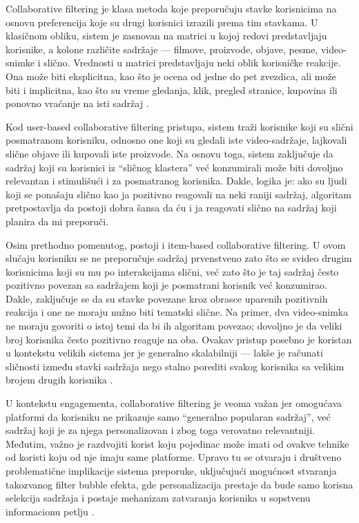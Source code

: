 Collaborative filtering je klasa metoda koje preporučuju stavke korisnicima na osnovu preferencija koje su drugi korisnici izrazili prema tim stavkama. U klasičnom obliku, sistem je zasnovan na matrici u kojoj redovi predstavljaju korisnike, a kolone različite sadržaje — filmove, proizvode, objave, pesme, video-snimke i slično. Vrednosti u matrici predstavljaju neki oblik korisničke reakcije. Ona može biti eksplicitna, kao što je ocena od jedne do pet zvezdica, ali može biti i implicitna, kao što su vreme gledanja, klik, pregled stranice, kupovina ili ponovno vraćanje na isti sadržaj \cite{wen2008collaborative}.

Kod user-based collaborative filtering pristupa, sistem traži korisnike koji su slični posmatranom korisniku, odnosno one koji su gledali iste video-sadržaje, lajkovali slične objave ili kupovali iste proizvode. Na osnovu toga, sistem zaključuje da sadržaj koji su korisnici iz “sličnog klastera” već konzumirali može biti dovoljno relevantan i stimulišući i za posmatranog korisnika. Dakle, logika je: ako su ljudi koji se ponašaju slično kao ja pozitivno reagovali na neki raniji sadržaj, algoritam pretpostavlja da postoji dobra šansa da ću i ja reagovati slično na sadržaj koji planira da mi preporuči.

Osim prethodno pomenutog, postoji i item-based collaborative filtering. U ovom slučaju korisniku se ne preporučuje sadržaj prvenstveno zato što se svideo drugim korisnicima koji su mu po interakcijama slični, već zato što je taj sadržaj često pozitivno povezan sa sadržajem koji je posmatrani korisnik već konzumirao. Dakle, zaključuje se da su stavke povezane kroz obrasce uparenih pozitivnih reakcija i one ne moraju nužno biti tematski slične. Na primer, dva video-snimka ne moraju govoriti o istoj temi da bi ih algoritam povezao; dovoljno je da veliki broj korisnika često pozitivno reaguje na oba. Ovakav pristup posebno je koristan u kontekstu velikih sistema jer je generalno skalabilniji — lakše je računati sličnosti između stavki sadržaja nego stalno porediti svakog korisnika sa velikim brojem drugih korisnika \cite{wen2008collaborative}.

U kontekstu engagementa, collaborative filtering je veoma važan jer omogućava platformi da korisniku ne prikazuje samo “generalno popularan sadržaj”, već sadržaj koji je za njega personalizovan i zbog toga verovatno relevantniji. Međutim, važno je razdvojiti korist koju pojedinac može imati od ovakve tehnike od koristi koju od nje imaju same platforme. Upravo tu se otvaraju i društveno problematične implikacije sistema preporuke, uključujući mogućnost stvaranja takozvanog filter bubble efekta, gde personalizacija prestaje da bude samo korisna selekcija sadržaja i postaje mehanizam zatvaranja korisnika u sopstvenu informacionu petlju \cite{nguyen2014filterbubble}.

